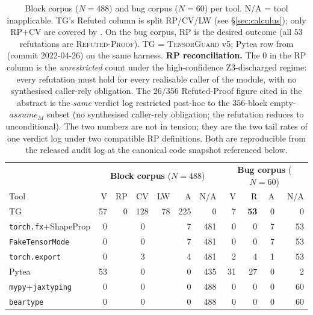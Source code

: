 \begin{table}[t]
\centering
\caption{Block corpus ($N=488$) and bug corpus ($N=60$) per tool.
\textsc{N/A} = tool inapplicable. \textsc{TG}'s Refuted column is split
RP/CV/LW (see \S\ref{sec:calculus}); only RP$+$CV are covered by
. On the bug corpus, RP is the desired outcome
(all $53$ refutations are \textsc{Refuted-Proof}).
\textsc{TG} = \textsc{TensorGuard} v5; Pytea row from
 (commit 2022-04-26) on the same harness.
\textbf{RP reconciliation.} The $0$ in the RP column is the
\emph{unrestricted} count under the high-confidence Z3-discharged
regime: every refutation must hold for every realisable caller of
the module, with no synthesised caller-rely obligation. The
$26/356$ Refuted-Proof figure cited in the abstract is the
\emph{same} verdict log restricted post-hoc to the $356$-block
empty-$\mathit{assume}_M$ subset (no synthesised caller-rely
obligation; the refutation reduces to unconditional). The two
numbers are not in tension; they are the two tail rates of one
verdict log under two compatible RP definitions. Both are
reproducible from the released audit log at the canonical code
snapshot referenced below.}
\label{tab:headline}
\small
\setlength{\tabcolsep}{3pt}
\begin{tabular}{l rrrrrr | rrrr}
\toprule
& \multicolumn{6}{c|}{\textbf{Block corpus} ($N{=}488$)}
& \multicolumn{4}{c}{\textbf{Bug corpus} ($N{=}60$)} \\
Tool & V & RP & CV & LW & A & N/A & V & R & A & N/A \\
\midrule
\textsc{TG} & 57 & 0 & 128 & 78 & 225 & 0 & 7 & \textbf{53} & 0 & 0 \\
\texttt{torch.fx}+ShapeProp & 0 & \multicolumn{3}{c}{0} & 7 & 481 & 0 & 0 & 7 & 53 \\
\texttt{FakeTensorMode} & 0 & \multicolumn{3}{c}{0} & 7 & 481 & 0 & 0 & 7 & 53 \\
\texttt{torch.export} & 0 & \multicolumn{3}{c}{3} & 4 & 481 & 2 & 4 & 1 & 53 \\
Pytea & 53 & \multicolumn{3}{c}{0} & 0 & 435 & 31 & 27 & 0 & 2 \\
\texttt{mypy}+\texttt{jaxtyping} & 0 & \multicolumn{3}{c}{0} & 0 & 488 & 0 & 0 & 0 & 60 \\
\texttt{beartype} & 0 & \multicolumn{3}{c}{0} & 0 & 488 & 0 & 0 & 0 & 60 \\
\bottomrule
\end{tabular}
\end{table}

